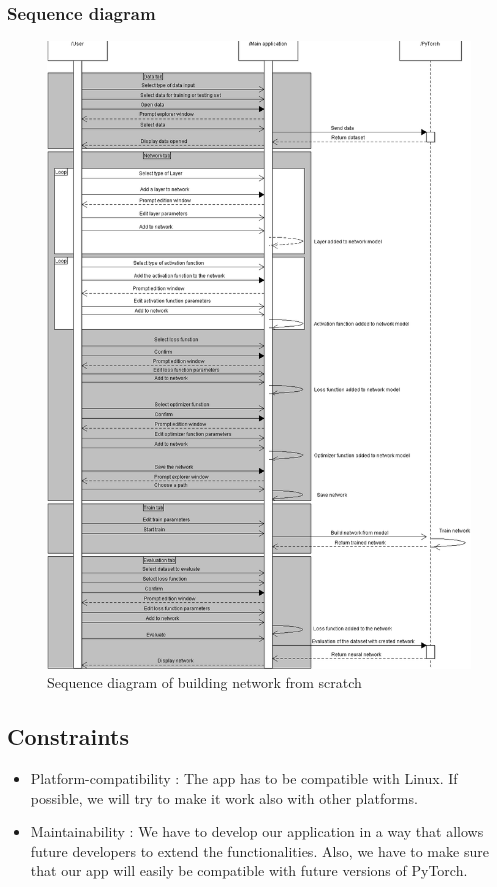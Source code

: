     \subsubsection{Sequence diagram}
    \begin{figure}[htbp]
        \vspace*{-1.5cm}
        \centerline{\includegraphics[scale=0.65]{figures/diagSeq.png}}
        \caption{Sequence diagram of building network from scratch}
    \end{figure}
\newpage

\subsection{Constraints}

\begin{itemize}
\item Platform-compatibility : The app has to be compatible with Linux. If possible, we will try to make it work also with other platforms.
\item Maintainability : We have to develop our application in a way that allows future developers to extend the functionalities. Also, we have to make sure that our app will easily be compatible with future versions of PyTorch.
\end{itemize}


